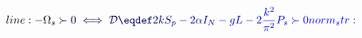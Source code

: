 \documentclass[12pt]{article}
\begin{document}
\makeatletter
\renewcommand*{\@textcolor}[3]{%
  \protect\leavevmode
  \begingroup
    \color#1{#2}#3%
  \endgroup
}
\makeatother
\begin{displaymath}
\mathcolor[RGB]{0,0,15}{line:
-\Omega_s} \mathcolor[RGB]{0,0,30}{\succ} \mathcolor[RGB]{0,0,45}{0} \mathcolor[RGB]{0,0,60}{\iff} \mathcolor[RGB]{0,0,75}{\mathcal{D}} \mathcolor[RGB]{0,0,90}{\eqdef} \mathcolor[RGB]{0,0,105}{2kS_p} \mathcolor[RGB]{0,0,120}{-} \mathcolor[RGB]{0,0,135}{2\alpha} \mathcolor[RGB]{0,0,150}{I_N} \mathcolor[RGB]{0,0,165}{-} \mathcolor[RGB]{0,0,180}{gL} \mathcolor[RGB]{0,0,195}{-} \mathcolor[RGB]{0,0,210}{2\frac{k^2}{\pi^2}P_s} \mathcolor[RGB]{0,0,225}{\succ} \mathcolor[RGB]{0,0,240}{0

norm_str:}
\end{displaymath}
\end{document}
